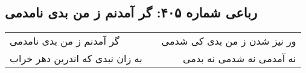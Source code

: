 \begin{center}
\section*{رباعی شماره ۴۰۵: گر آمدنم ز من بدی نامدمی}
\label{sec:sh405}
\begin{longtable}{l p{0.5cm} r}
گر آمدنم ز من بدی نامدمی
&&
ور نیز شدن ز من بدی کی شدمی
\\
به زان نبدی که اندرین دهر خراب
&&
نه آمدمی نه شدمی نه بدمی
\\
\end{longtable}
\end{center}
